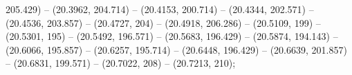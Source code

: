 205.429) -- (20.3962, 204.714) -- (20.4153, 200.714) -- (20.4344, 202.571) -- (20.4536, 203.857) -- (20.4727, 204) -- (20.4918, 206.286) -- (20.5109, 199) -- (20.5301, 195) -- (20.5492, 196.571) -- (20.5683, 196.429) -- (20.5874, 194.143) -- (20.6066, 195.857) -- (20.6257, 195.714) -- (20.6448, 196.429) -- (20.6639, 201.857) -- (20.6831, 199.571) -- (20.7022, 208) -- (20.7213, 210);
